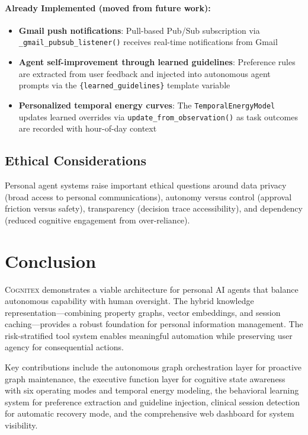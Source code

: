 \documentclass[11pt,a4paper]{article}
\newcommand{\cognitex}{\textsc{Cognitex}}
\begin{document}
\paragraph{Already Implemented (moved from future work):}
\begin{itemize}
    \item \textbf{Gmail push notifications}: Pull-based Pub/Sub subscription via \texttt{\_gmail\_pubsub\_listener()} receives real-time notifications from Gmail
    \item \textbf{Agent self-improvement through learned guidelines}: Preference rules are extracted from user feedback and injected into autonomous agent prompts via the \texttt{\{learned\_guidelines\}} template variable
    \item \textbf{Personalized temporal energy curves}: The \texttt{TemporalEnergyModel} updates learned overrides via \texttt{update\_from\_observation()} as task outcomes are recorded with hour-of-day context
\end{itemize}

\subsection{Ethical Considerations}

Personal agent systems raise important ethical questions around data privacy (broad access to personal communications), autonomy versus control (approval friction versus safety), transparency (decision trace accessibility), and dependency (reduced cognitive engagement from over-reliance).

\section{Conclusion}
\label{sec:conclusion}

\cognitex{} demonstrates a viable architecture for personal AI agents that balance autonomous capability with human oversight. The hybrid knowledge representation---combining property graphs, vector embeddings, and session caching---provides a robust foundation for personal information management. The risk-stratified tool system enables meaningful automation while preserving user agency for consequential actions.

Key contributions include the autonomous graph orchestration layer for proactive graph maintenance, the executive function layer for cognitive state awareness with six operating modes and temporal energy modeling, the behavioral learning system for preference extraction and guideline injection, clinical session detection for automatic recovery mode, and the comprehensive web dashboard for system visibility.
\end{document}
